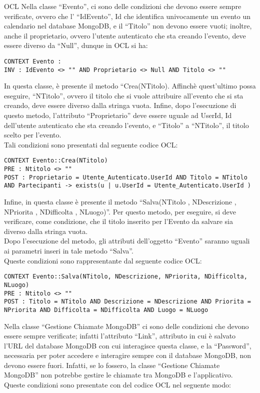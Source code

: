 \begin{listaPersonale}{OCL}
    Nella classe “Evento”, ci sono delle condizioni che devono essere sempre verificate, ovvero che l' “IdEvento”, Id che identifica univocamente un evento un calendario nel database MongoDB, e il “Titolo” non devono essere vuoti; inoltre, anche il proprietario, ovvero l'utente autenticato che sta creando l'evento, deve essere diverso da “Null”, dunque in OCL si ha:
    \begin{lstlisting}
CONTEXT Evento :
INV : IdEvento <> "" AND Proprietario <> Null AND Titolo <> ""
    \end{lstlisting}
    In questa classe, è presente il metodo “Crea(NTitolo). Affinchè quest'ultimo possa eseguire, “NTitolo”, ovvero il titolo che si vuole attribuire all'evento che si sta creando, deve essere diverso dalla stringa vuota. Infine, dopo l'esecuzione di questo metodo, l'attributo “Proprietario” deve essere uguale ad UserId, Id dell'utente autenticato che sta creando l'evento, e “Titolo” a “NTitolo”, il titolo scelto per l'evento. \\
    Tali condizioni sono presentati dal seguente codice OCL:
    \begin{lstlisting}
CONTEXT Evento::Crea(NTitolo)
PRE : Ntitolo <> ""
POST : Proprietario = Utente_Autenticato.UserId AND Titolo = NTitolo AND Partecipanti -> exists(u | u.UserId = Utente_Autenticato.UserId )
    \end{lstlisting}
    Infine, in questa classe è presente il metodo “Salva(NTitolo , NDescrizione , NPriorita , NDifficolta , NLuogo)”. Per questo metodo, per eseguire, si deve verificare, come condizione, che il titolo inserito per l'Evento da salvare sia diverso dalla stringa vuota. \\
    Dopo l'esecuzione del metodo, gli attributi dell'oggetto “Evento” saranno uguali ai parametri inseri in tale metodo “Salva”. \\
    Queste condizioni sono rappresentante dal seguente codice OCL:

    \begin{lstlisting}
CONTEXT Evento::Salva(NTitolo, NDescrizione, NPriorita, NDifficolta, NLuogo)
PRE : Ntitolo <> ""
POST : Titolo = NTitolo AND Descrizione = NDescrizione AND Priorita = NPriorita AND Difficolta = NDifficolta AND Luogo = NLuogo 
    \end{lstlisting}




    Nella classe “Gestione Chiamate MongoDB” ci sono delle condizioni che devono essere sempre verificate; infatti l’attributo “Link”, attributo in cui è salvato l’URL del database MongoDB con cui interagisce questa classe, e la “Password”, necessaria per poter accedere e interagire sempre con il database MongoDB, non devono essere fuori. Infatti, se lo fossero, la classe “Gestione Chiamate MongoDB” non potrebbe gestire le chiamate tra MongoDB e l’applicativo.\\
    Queste condizioni sono presentate con del codice OCL nel seguente modo:


\end{listaPersonale}
